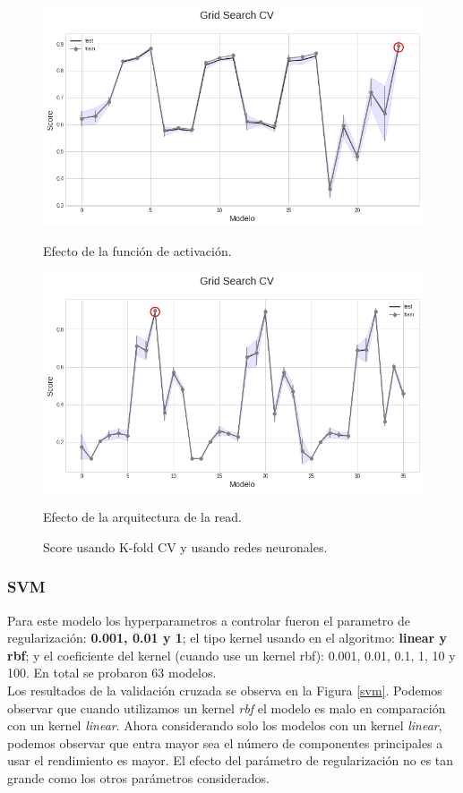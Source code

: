 \documentclass[paper=letter, fontsize=11pt]{scrartcl}
\numberwithin{equation}{section} %
\numberwithin{figure}{section} %
\numberwithin{table}{section} %
\begin{document}
\begin{figure}[!htb]
  \includegraphics[width=\linewidth]{figure/redes_neuronales_2.png}
  \caption{Efecto de la función de activación.}\label{act}
\endminipage\hfill
{}
  \includegraphics[width=\linewidth]{figure/redes_neuronales.png}\caption{Efecto de la arquitectura de la read.}\label{arqui}
\endminipage
\caption{Score usando K-fold CV y usando redes neuronales.}\label{redes}
\end{figure}


\subsubsection*{SVM}
Para este modelo los hyperparametros a controlar fueron el parametro de regularización: \textbf{0.001, 0.01 y 1};   el tipo kernel usando en el algoritmo: \textbf{linear y rbf}; y el coeficiente del kernel (cuando use un kernel rbf): 0.001, 0.01, 0.1, 1, 10 y 100. En total se probaron 63 modelos.\\

Los resultados de la validación cruzada se observa en la Figura \ref{svm}. Podemos observar que cuando utilizamos un kernel \textit{rbf} el modelo es malo en comparación con un kernel \textit{linear}. Ahora considerando solo los modelos con un kernel \textit{linear}, podemos observar que entra mayor sea el número de componentes principales a usar el rendimiento es mayor. El efecto del  parámetro de regularización no es tan grande como los otros parámetros considerados. 
\end{document}

